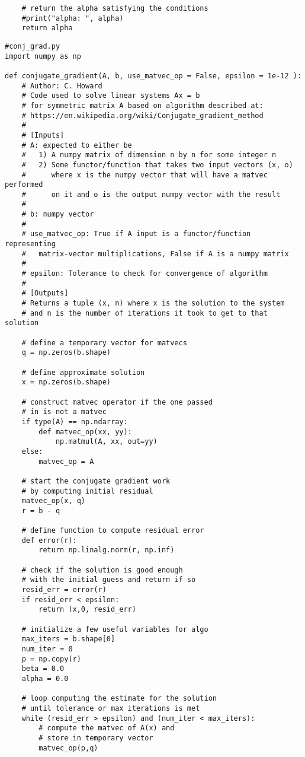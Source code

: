 {\begin{verbatim}
    # return the alpha satisfying the conditions
    #print("alpha: ", alpha)
    return alpha
\end{verbatim}

\begin{verbatim}
#conj_grad.py
import numpy as np

def conjugate_gradient(A, b, use_matvec_op = False, epsilon = 1e-12 ):
    # Author: C. Howard
    # Code used to solve linear systems Ax = b
    # for symmetric matrix A based on algorithm described at:
    # https://en.wikipedia.org/wiki/Conjugate_gradient_method
    #
    # [Inputs]
    # A: expected to either be
    #   1) A numpy matrix of dimension n by n for some integer n
    #   2) Some functor/function that takes two input vectors (x, o)
    #      where x is the numpy vector that will have a matvec performed
    #      on it and o is the output numpy vector with the result
    #
    # b: numpy vector
    #
    # use_matvec_op: True if A input is a functor/function representing
    #   matrix-vector multiplications, False if A is a numpy matrix
    #
    # epsilon: Tolerance to check for convergence of algorithm
    #
    # [Outputs]
    # Returns a tuple (x, n) where x is the solution to the system
    # and n is the number of iterations it took to get to that solution

    # define a temporary vector for matvecs
    q = np.zeros(b.shape)

    # define approximate solution
    x = np.zeros(b.shape)

    # construct matvec operator if the one passed
    # in is not a matvec
    if type(A) == np.ndarray:
        def matvec_op(xx, yy):
            np.matmul(A, xx, out=yy)
    else:
        matvec_op = A

    # start the conjugate gradient work
    # by computing initial residual
    matvec_op(x, q)
    r = b - q

    # define function to compute residual error
    def error(r):
        return np.linalg.norm(r, np.inf)

    # check if the solution is good enough
    # with the initial guess and return if so
    resid_err = error(r)
    if resid_err < epsilon:
        return (x,0, resid_err)
    
    # initialize a few useful variables for algo
    max_iters = b.shape[0]
    num_iter = 0
    p = np.copy(r)
    beta = 0.0
    alpha = 0.0

    # loop computing the estimate for the solution
    # until tolerance or max iterations is met
    while (resid_err > epsilon) and (num_iter < max_iters):
        # compute the matvec of A(x) and
        # store in temporary vector
        matvec_op(p,q)


\end{verbatim}}
